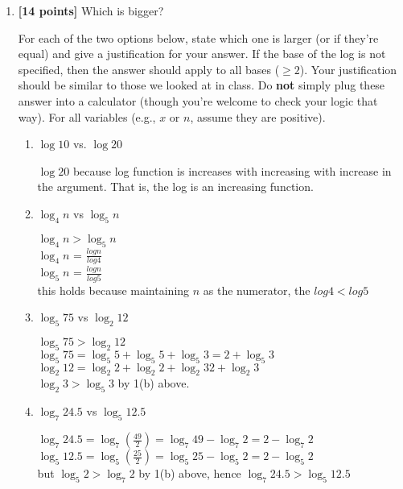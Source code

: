 \documentclass[11pt]{article}
\begin{document}
\begin{enumerate}

\item \textbf{[14 points]} Which is bigger?

For each of the two options below, state which one is larger (or if they're equal) and give a justification for your answer.  If the base of the log is not specified, then the answer should apply to all bases ($\ge 2$).  Your justification should be similar to those we looked at in class.  Do \textbf{not} simply plug these answer into a calculator (though you're welcome to check your logic that way).  For all variables (e.g., $x$ or $n$, assume they are positive).

\begin{enumerate}

\item $\log 10$ vs. $\log 20$

    $\log 20$ because log function is increases with increasing with increase in the argument. That is, the log is an increasing function.

\item $\log_4 n$ vs $\log_5 n$

    $\log_4 n > \log_5 n$ \\
    $\log_4 n$ = $\frac{log n}{log 4}$ \\
    $\log_5 n$ = $\frac{log n}{log 5}$ \\
    this holds because maintaining $n$ as the numerator, the $log 4 < log 5$


\item $\log_5 75$ vs $\log_2 12$

    $\log_5 75 > \log_2 12$ \\
    $\log_5 75 = \log_5 5 + \log_5 5 + \log_5 3  = 2 + \log_5 3 $\\
    $\log_2 12 = \log_2 2 + \log_2 2 + \log_2 3 2 + \log_2 3 $\\
    
    $\log_2 3 > \log_5 3$ by 1(b) above.


\item $\log_7 24.5 $ vs $\log_5 12.5$

    $\log_7 24.5 = \log_7 (\frac{49}{2}) = \log_7 49 - \log_7 2 = 2 - \log_7 2$ \\
    $\log_5 12.5 = \log_5 (\frac{25}{2}) = \log_5 25 - \log_5 2 = 2 - \log_5 2$ \\
    but $\log_5 2 > \log_7 2$ by 1(b) above, hence $\log_7 24.5 > \log_5 12.5$ \\



\end{enumerate}
\end{enumerate}
\end{document}
